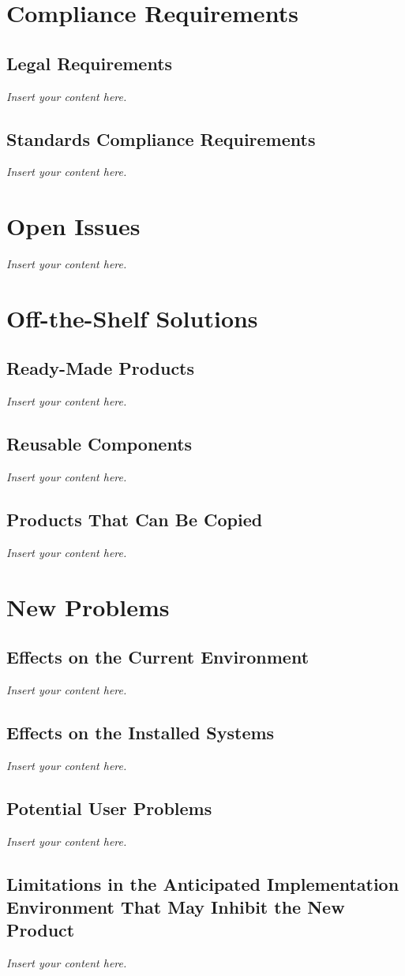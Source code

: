 \documentclass[12pt]{article}
\newcommand{\lips}{\textit{Insert your content here.}}
\begin{document}
\section{Compliance Requirements}
\subsection{Legal Requirements}
\lips
\subsection{Standards Compliance Requirements}
\lips

\section{Open Issues}
\lips

\section{Off-the-Shelf Solutions}
\subsection{Ready-Made Products}
\lips
\subsection{Reusable Components}
\lips
\subsection{Products That Can Be Copied}
\lips

\section{New Problems}
\subsection{Effects on the Current Environment}
\lips
\subsection{Effects on the Installed Systems}
\lips
\subsection{Potential User Problems}
\lips
\subsection{Limitations in the Anticipated Implementation Environment That May
Inhibit the New Product}
\lips
\end{document}
